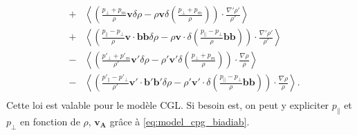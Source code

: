 \begin{eqnarray}
  & +&  \left<  \left(  \frac{p_{\perp}+p_m }{\rho} \boldsymbol{v}\delta \rho - \rho \boldsymbol{v}\delta \left(\frac{ p_{\perp}+p_m }{\rho}\right) \right)\cdot  \frac{\nabla' \rho'}{\rho'} \right>\nonumber \\
  &+&  \left<  \left(    \frac{ p_{\parallel}-p_{\perp}}{\rho} \boldsymbol{v} \cdot\boldsymbol{b}\boldsymbol{b} \delta \rho -\rho  \boldsymbol{v} \cdot \delta \left(\frac{ p_{\parallel}-p_{\perp}}{\rho}\boldsymbol{b}\boldsymbol{b} \right)  \right)\cdot  \frac{\nabla' \rho'}{\rho'} \right>\nonumber \\
 &-& \left< \left(  \frac{ p'_{\perp}+p'_m }{\rho'} \boldsymbol{v'}\delta \rho - \rho' \boldsymbol{v'}\delta \left(\frac{ p_{\perp}+p_m }{\rho}\right) \right) \cdot  \frac{\nabla \rho}{\rho} \right>\nonumber \\
 &-&   \left< \left(  \frac{ p'_{\parallel}-p'_{\perp}}{\rho'}\boldsymbol{v'} \cdot\boldsymbol{b'}\boldsymbol{b'}  \delta \rho - \rho' \boldsymbol{v'} \cdot\delta \left(\frac{ p_{\parallel}-p_{\perp}}{\rho}\boldsymbol{b}\boldsymbol{b} \right)\right) \cdot  \frac{\nabla \rho}{\rho} \right> .\nonumber\\
\end{eqnarray}
Cette loi est valable pour le modèle \ac{CGL}. Si besoin est, on peut y expliciter $p_{\parallel}$ et $p_{\perp}$ en fonction de $\rho$, $\boldsymbol{v_A}$ grâce à \eqref{eq:model_cpg_biadiab}. 

